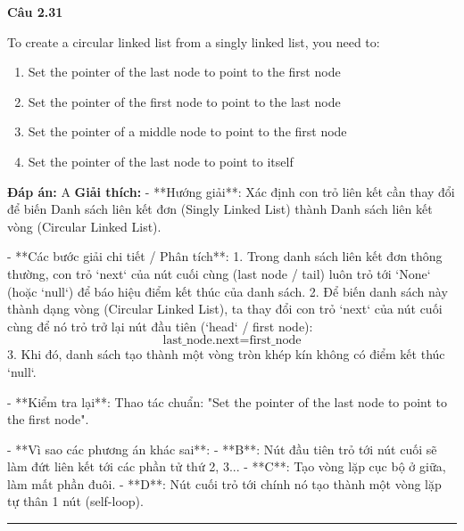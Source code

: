 \documentclass[11pt,a4paper]{article}
\newenvironment{question}[1]{%
  \par\vspace{1em}\noindent\textbf{\large Câu #1}\par\vspace{0.4em}
}{%
  \par\vspace{1em}\hrule\vspace{0.6em}
}
\newenvironment{choices}{%
  \begin{enumerate}[label=\textbf{\Alph*.},leftmargin=2.2em,itemsep=2pt,topsep=3pt]
}{%
  \end{enumerate}
}
\newcommand{\choice}{\item}
\begin{document}
\begin{question}{2.31}
To create a circular linked list from a singly linked list, you need to:
\begin{choices}
\choice Set the pointer of the last node to point to the first node
\choice Set the pointer of the first node to point to the last node
\choice Set the pointer of a middle node to point to the first node
\choice Set the pointer of the last node to point to itself
\end{choices}
\textbf{Đáp án:} A
\textbf{Giải thích:} - **Hướng giải**:
  Xác định con trỏ liên kết cần thay đổi để biến Danh sách liên kết đơn (Singly Linked List) thành Danh sách liên kết vòng (Circular Linked List).

- **Các bước giải chi tiết / Phân tích**:
  1. Trong danh sách liên kết đơn thông thường, con trỏ `next` của nút cuối cùng (last node / tail) luôn trỏ tới `None` (hoặc `null`) để báo hiệu điểm kết thúc của danh sách.
  2. Để biến danh sách này thành dạng vòng (Circular Linked List), ta thay đổi con trỏ `next` của nút cuối cùng để nó trỏ trở lại nút đầu tiên (`head` / first node):
     \[
     \text{last\_node.next} = \text{first\_node}
     \]
  3. Khi đó, danh sách tạo thành một vòng tròn khép kín không có điểm kết thúc `null`.

- **Kiểm tra lại**:
  Thao tác chuẩn: "Set the pointer of the last node to point to the first node".

- **Vì sao các phương án khác sai**:
  - **B**: Nút đầu tiên trỏ tới nút cuối sẽ làm đứt liên kết tới các phần tử thứ 2, 3...
  - **C**: Tạo vòng lặp cục bộ ở giữa, làm mất phần đuôi.
  - **D**: Nút cuối trỏ tới chính nó tạo thành một vòng lặp tự thân 1 nút (self-loop).
\end{question}
\end{document}
